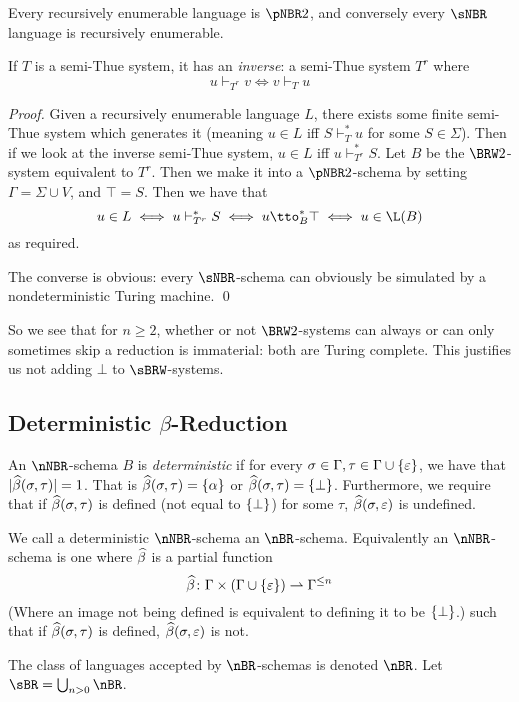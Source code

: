 \documentclass{llncs}
\begin{document}
\begin{theorem}

    Every recursively enumerable language is $\pNBR2$, and conversely every $\sNBR$ language is recursively enumerable.

\end{theorem}

If $T$ is a semi-Thue system, it has an \emph{inverse}: a semi-Thue system $T^r$ where
$$ u\vdash_{T^r}v \iff v\vdash_Tu $$

\begin{proof}

    Given a recursively enumerable language $L$, there exists some finite semi-Thue system which generates it (meaning
    $u\in L$ iff $S\vdash_T^*u$ for some $S\in\Sigma$).
    Then if we look at the inverse semi-Thue system, $u\in L$ iff $u\vdash_{T^r}^*S$.
    Let $B$ be the $\BRW2$-system equivalent to $T^r$.
    Then we make it into a $\pNBR2$-schema by setting $\Gamma=\Sigma\cup V$, and $\top=S$.
    Then we have that
    $$ u\in L \iff u\vdash_{T^r}^*S \iff u\tto_B^*\top \iff u\in\L(B) $$
    as required.

    The converse is obvious: every $\sNBR$-schema can obviously be simulated by a nondeterministic Turing machine.
    \qed

\end{proof}

So we see that for $n\geq2$, whether or not $\BRW2$-systems can always or can only sometimes skip a reduction is immaterial:
both are Turing complete.
This justifies us not adding $\bot$ to $\sBRW$-systems.

\subsection{Deterministic $\beta$-Reduction}

\begin{definition}

    An $\nNBR$-schema $B$ is \emph{deterministic} if for every $\sigma\in\Gamma,\tau\in\Gamma\cup\set\epsilon$, we have that
    $\lvert\widehat\beta(\sigma,\tau)\rvert=1$.
    That is $\hb(\sigma,\tau)=\set\alpha$ or $\hb(\sigma,\tau)=\set\perp$.
    Furthermore, we require that if $\widehat\beta(\sigma,\tau)$ is defined (not equal to $\set\perp$) for some $\tau$,
    $\widehat\beta(\sigma,\varepsilon)$ is undefined.

    We call a deterministic $\nNBR$-schema an $\nBR$-schema.
    Equivalently an $\nNBR$-schema is one where $\widehat\beta$ is a partial function
    $$ \hb\colon\Gamma\times(\Gamma\cup\set\epsilon) \partial \Gamma^{\leq n} $$
    (Where an image not being defined is equivalent to defining it to be $\set\perp$.)
    such that if $\widehat\beta(\sigma,\tau)$ is defined, $\widehat\beta(\sigma,\varepsilon)$ is not.

    The class of languages accepted by $\nBR$-schemas is denoted $\nBR$.
    Let $\sBR=\bigcup_{n>0}\nBR$.

\end{definition}
\end{document}
